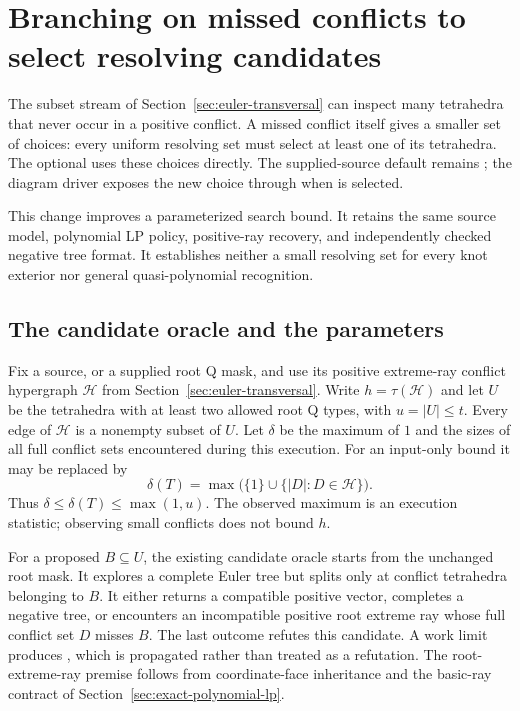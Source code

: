 \section{Branching on missed conflicts to select resolving candidates}
\label{sec:conflict-candidates}

The subset stream of Section~\ref{sec:euler-transversal} can inspect many
tetrahedra that never occur in a positive conflict.  A missed conflict itself
gives a smaller set of choices: every uniform resolving set must select at
least one of its tetrahedra.  The optional
 uses these choices directly.  The
supplied-source default remains ; the
diagram driver exposes the new choice through
 when
 is selected.

This change improves a parameterized search bound.  It retains the same
source model, polynomial LP policy, positive-ray recovery, and independently
checked negative tree format.  It establishes neither a small resolving
set for every knot exterior nor general quasi-polynomial recognition.

\subsection{The candidate oracle and the parameters}

Fix a source, or a supplied root Q mask, and use its positive extreme-ray
conflict hypergraph $\mathcal H$ from
Section~\ref{sec:euler-transversal}.  Write $h=\tau(\mathcal H)$ and let
$U$ be the tetrahedra with at least two allowed root Q types, with
$u=|U|\le t$.  Every edge of $\mathcal H$ is a nonempty subset of $U$.
Let $\delta$ be the maximum of $1$ and the sizes of all full conflict
sets encountered during this execution.  For an input-only bound it may
be replaced by
\[
 \delta(T)=\max\bigl(\{1\}\cup\{|D|:D\in\mathcal H\}\bigr).
\]
Thus $\delta\le\delta(T)\le\max(1,u)$.  The observed maximum is an
execution statistic; observing small conflicts does not bound $h$.

For a proposed $B\subseteq U$, the existing candidate oracle starts from
the unchanged root mask.  It explores a complete Euler tree but splits
only at conflict tetrahedra belonging to $B$.  It either returns a
compatible positive vector, completes a negative tree, or encounters an
incompatible positive root extreme ray whose full conflict set $D$ misses
$B$.  The last outcome refutes this candidate.  A work limit produces
, which is propagated rather than treated as a
refutation.  The root-extreme-ray premise follows from coordinate-face
inheritance and the basic-ray contract of
Section~\ref{sec:exact-polynomial-lp}.

